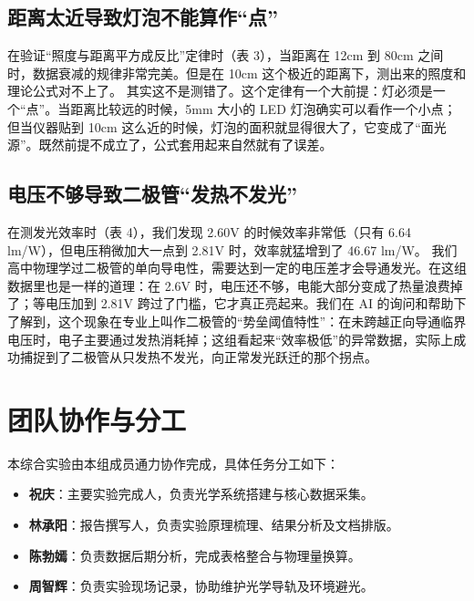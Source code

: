\documentclass[12pt, a4paper]{article}
\begin{document}
\subsection{距离太近导致灯泡不能算作“点”}
在验证“照度与距离平方成反比”定律时（表 3），当距离在 12cm 到 80cm 之间时，数据衰减的规律非常完美。但是在 10cm 这个极近的距离下，测出来的照度和理论公式对不上了。
其实这不是测错了。这个定律有一个大前提：灯必须是一个“点”。当距离比较远的时候，5mm 大小的 LED 灯泡确实可以看作一个小点；但当仪器贴到 10cm 这么近的时候，灯泡的面积就显得很大了，它变成了“面光源”。既然前提不成立了，公式套用起来自然就有了误差。

\subsection{电压不够导致二极管“发热不发光”}
在测发光效率时（表 4），我们发现 2.60V 的时候效率非常低（只有 6.64 lm/W），但电压稍微加大一点到 2.81V 时，效率就猛增到了 46.67 lm/W。
我们高中物理学过二极管的单向导电性，需要达到一定的电压差才会导通发光。在这组数据里也是一样的道理：在 2.6V 时，电压还不够，电能大部分变成了热量浪费掉了；等电压加到 2.81V 跨过了门槛，它才真正亮起来。我们在 AI 的询问和帮助下了解到，这个现象在专业上叫作二极管的“势垒阈值特性”：在未跨越正向导通临界电压时，电子主要通过发热消耗掉；这组看起来“效率极低”的异常数据，实际上成功捕捉到了二极管从只发热不发光，向正常发光跃迁的那个拐点。


\newpage %
\section{团队协作与分工}

本综合实验由本组成员通力协作完成，具体任务分工如下：

\begin{itemize}[itemsep=2pt, topsep=0pt]
    \item \textbf{祝庆}：主要实验完成人，负责光学系统搭建与核心数据采集。
    \item \textbf{林承阳}：报告撰写人，负责实验原理梳理、结果分析及文档排版。
    \item \textbf{陈勃嫣}：负责数据后期分析，完成表格整合与物理量换算。
    \item \textbf{周智辉}：负责实验现场记录，协助维护光学导轨及环境避光。
\end{itemize}
\end{document}
